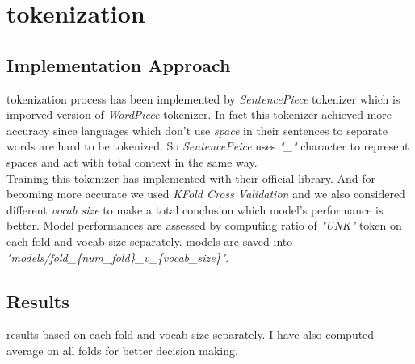 \documentclass[10pt, a4paper]{article}
\begin{document}
\section{tokenization}
\subsection{Implementation Approach}
tokenization process has been implemented by \textit{SentencePiece} tokenizer which is imporved version of \textit{WordPiece} tokenizer. In fact this tokenizer
achieved more accuracy since languages which don't use \textit{space} in their sentences to separate words are hard to be tokenized. So \textit{SentencePeice} uses
\textit{"\_"} character to represent spaces and act with total context in the same way.
\\
Training this tokenizer has implemented with their \href{https://github.com/google/sentencepiece}{official library}. And for becoming more accurate we used \textit{KFold Cross Validation}
and we also considered different \textit{vocab size} to make a total conclusion which model's performance is better. Model performances are assessed by computing ratio of \textit{"UNK"} token on each fold and vocab size separately.
models are saved into \textit{"models/fold\_\{num\_fold\}\_v\_\{vocab\_size\}"}.

\subsection{Results}
results based on each fold and vocab size separately. I have also computed average on all folds for better decision making.
\\
\begin{center}
    \begin{adjustbox}{max width=0.8\textwidth}
    \end{adjustbox}
\end{center}
\end{document}
